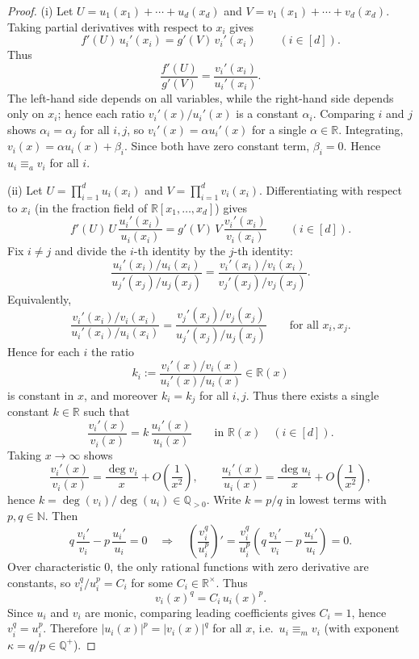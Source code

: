 \documentclass[12pt,reqno]{amsart}
\numberwithin{equation}{section}
\begin{document}
\begin{proof}
(i) Let $U = u_1(x_1) + \cdots + u_d(x_d)$ and $V = v_1(x_1) + \cdots + v_d(x_d)$.
Taking partial derivatives with respect to $x_i$ gives
\[
f'(U)\,u_i'(x_i)=g'(V)\,v_i'(x_i)\qquad (i\in[d]).
\]
Thus
\[
\frac{f'(U)}{g'(V)}=\frac{v_i'(x_i)}{u_i'(x_i)}.
\]
The left-hand side depends on all variables, while the right-hand side depends only on $x_i$; hence each ratio
$v_i'(x)/u_i'(x)$ is a constant $\alpha_i$.
Comparing $i$ and $j$ shows $\alpha_i=\alpha_j$ for all $i,j$, so $v_i'(x)=\alpha u_i'(x)$ for a single $\alpha\in\mathbb R$.
Integrating, $v_i(x)=\alpha u_i(x)+\beta_i$. Since both have zero constant term, $\beta_i=0$.
Hence $u_i\equiv_a v_i$ for all $i$.

(ii) Let $U = \prod_{i=1}^d u_i(x_i)$ and $V=\prod_{i=1}^d v_i(x_i)$.
Differentiating with respect to $x_i$ (in the fraction field of $\mathbb R[x_1,\dots,x_d]$) gives
\[
f'(U)\,U\,\frac{u_i'(x_i)}{u_i(x_i)}=g'(V)\,V\,\frac{v_i'(x_i)}{v_i(x_i)}\qquad (i\in[d]).
\]
Fix $i\neq j$ and divide the $i$-th identity by the $j$-th identity:
\[
\frac{u_i'(x_i)/u_i(x_i)}{u_j'(x_j)/u_j(x_j)}=
\frac{v_i'(x_i)/v_i(x_i)}{v_j'(x_j)/v_j(x_j)}.
\]
Equivalently,
\[
\frac{v_i'(x_i)/v_i(x_i)}{u_i'(x_i)/u_i(x_i)}=
\frac{v_j'(x_j)/v_j(x_j)}{u_j'(x_j)/u_j(x_j)}\qquad\text{for all }x_i,x_j.
\]
Hence for each $i$ the ratio
\[
k_i:=\frac{v_i'(x)/v_i(x)}{u_i'(x)/u_i(x)}\in\mathbb R(x)
\]
is constant in $x$, and moreover $k_i=k_j$ for all $i,j$.
Thus there exists a single constant $k\in\mathbb R$ such that
\[
\frac{v_i'(x)}{v_i(x)}=k\,\frac{u_i'(x)}{u_i(x)}\qquad\text{in }\mathbb R(x)\quad(i\in[d]).
\]
Taking $x\to\infty$ shows
\[
\frac{v_i'(x)}{v_i(x)}=\frac{\deg v_i}{x}+O\!\left(\frac1{x^2}\right),
\qquad
\frac{u_i'(x)}{u_i(x)}=\frac{\deg u_i}{x}+O\!\left(\frac1{x^2}\right),
\]
hence $k=\deg(v_i)/\deg(u_i)\in\mathbb Q_{>0}$.
Write $k=p/q$ in lowest terms with $p,q\in\mathbb N$.
Then
\[
q\,\frac{v_i'}{v_i}-p\,\frac{u_i'}{u_i}=0
\quad\Longrightarrow\quad
\left(\frac{v_i^q}{u_i^p}\right)'= \frac{v_i^q}{u_i^p}\left(q\,\frac{v_i'}{v_i}-p\,\frac{u_i'}{u_i}\right)=0.
\]
Over characteristic $0$, the only rational functions with zero derivative are constants, so $v_i^q/u_i^p=C_i$ for some $C_i\in\mathbb R^\times$.
Thus
\[
v_i(x)^q = C_i\,u_i(x)^p.
\]
Since $u_i$ and $v_i$ are monic, comparing leading coefficients gives $C_i=1$, hence $v_i^q=u_i^p$.
Therefore $|u_i(x)|^p=|v_i(x)|^q$ for all $x$, i.e.\ $u_i\equiv_m v_i$ (with exponent $\kappa=q/p\in\mathbb Q^+$).
\end{proof}
\end{document}
